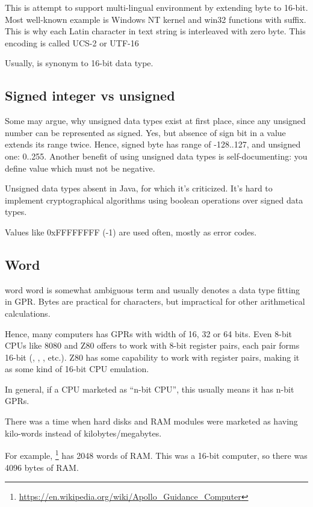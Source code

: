 This is attempt to support multi-lingual environment by extending byte to 16-bit.
Most well-known example is Windows NT kernel and win32 functions with  suffix.
This is why each Latin character in text string is interleaved with zero byte.
This encoding is called UCS-2 or UTF-16

Usually,  is synonym to 16-bit  data type.

\subsection{Signed integer vs unsigned}

Some may argue, why unsigned data types exist at first place, since any unsigned number can be represented as signed.
Yes, but absence of sign bit in a value extends its range twice.
Hence, signed byte has range of -128..127, and unsigned one: 0..255.
Another benefit of using unsigned data types is self-documenting: you define value which must not be negative.

Unsigned data types absent in Java, for which it's criticized.
It's hard to implement cryptographical algorithms using boolean operations over signed data types.

Values like 0xFFFFFFFF (-1) are used often, mostly as error codes.

\subsection{Word}

\Gls{word} word is somewhat ambiguous term and usually denotes a data type fitting in \ac{GPR}.
Bytes are practical for characters, but impractical for other arithmetical calculations.

Hence, many computers has GPRs with width of 16, 32 or 64 bits.
Even 8-bit CPUs like 8080 and Z80 offers to work with 8-bit register pairs, each pair forms 16-bit 
(, , , etc.).
Z80 has some capability to work with register pairs, making it as some kind of 16-bit CPU emulation.

In general, if a CPU marketed as ``n-bit CPU'', this usually means it has n-bit \ac{GPR}s.

There was a time when hard disks and \ac{RAM} modules were marketed as having  kilo-words instead of
 kilobytes/megabytes.

For example, \footnote{\url{https://en.wikipedia.org/wiki/Apollo_Guidance_Computer}}
has 2048 words of \ac{RAM}.
This was a 16-bit computer, so there was 4096 bytes of \ac{RAM}.

